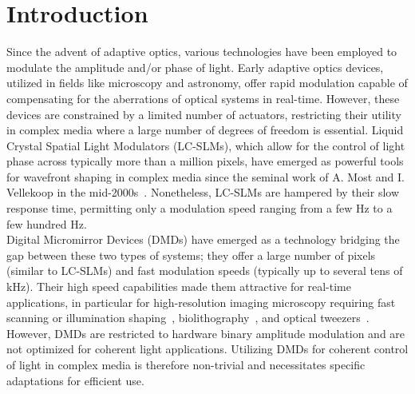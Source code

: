 \documentclass[12pt]{iopart}
\newcommand{\red}[1]{#1}
\begin{document}
%
%
%
% 
%

\section{Introduction}

Since the advent of adaptive optics, various technologies have been employed
to modulate the amplitude and/or phase of light.
Early adaptive optics devices, utilized in fields like microscopy and astronomy,
offer rapid modulation capable of compensating for the aberrations of optical systems
in real-time.
However, these devices are constrained by a limited number of actuators,
restricting their utility in complex media where a large number of degrees of freedom is essential.
Liquid Crystal Spatial Light Modulators (LC-SLMs),
which allow for the control of light phase across typically more than a million pixels,
have emerged as powerful tools for wavefront shaping in complex media
since the seminal work of A. Most and I. Vellekoop in the mid-2000s~\cite{Vellekoop2007focusing}.
Nonetheless, LC-SLMs are hampered by their slow response time,
permitting only a modulation speed ranging from a few Hz to \red{a few hundred} Hz.\\

Digital Micromirror Devices (DMDs) have emerged as a technology bridging the gap
between these two types of systems;
they offer a large number of pixels (similar to LC-SLMs) and fast modulation speeds (typically up to several tens of kHz).
Their high speed capabilities made them attractive for real-time applications,
in particular for high-resolution imaging microscopy
requiring fast scanning or illumination shaping~\cite{cha2000nontranslational,Zhuang2020},
biolithography~\cite{yoon2018emerging},
and optical tweezers~\cite{gauthier2016direct}.
However, DMDs are restricted to hardware binary amplitude modulation and are not optimized for coherent light applications.
Utilizing DMDs for coherent control of light in complex media is therefore non-trivial
and necessitates specific adaptations for efficient use.\\
\end{document}
